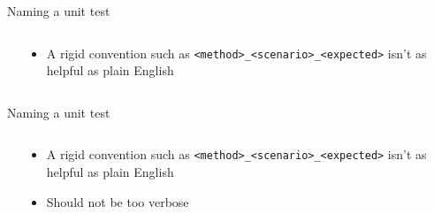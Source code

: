 \documentclass[english,10pt,aspectratio=169,t]{beamer}
\begin{document}
\begin{frame}{Naming a unit test}
  \begin{columns}[T]
    \begin{column}[]{0.55\textwidth}
      \begin{minipage}{\linewidth}
        \rigidname
      \end{minipage}
    \end{column}
    \begin{column}[]{0.45\textwidth}
      \begin{itemize}
        \item A rigid convention such as \texttt{<method>\_<scenario>\_<expected>}
        isn't as helpful as plain English
      \end{itemize}
    \end{column}
  \end{columns}
\end{frame}

\begin{frame}{Naming a unit test}
  \begin{columns}[T]
    \begin{column}[]{0.55\textwidth}
      \begin{minipage}{\linewidth}
        \rigidname
        \verbosename
      \end{minipage}
    \end{column}
    \begin{column}[]{0.45\textwidth}
      \begin{itemize}
        \item A rigid convention such as \texttt{<method>\_<scenario>\_<expected>}
        isn't as helpful as plain English
        \item Should not be too verbose
      \end{itemize}
    \end{column}
  \end{columns}
\end{frame}
\end{document}

